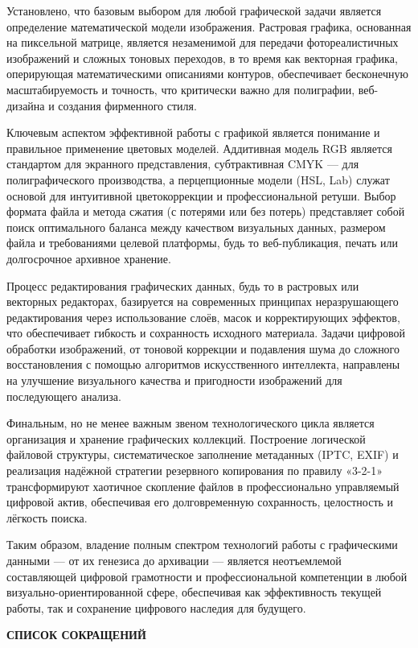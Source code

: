\documentclass{SibFU-docs}
\begin{document}
Установлено, что базовым выбором для любой графической задачи является определение математической модели изображения. Растровая графика, основанная на пиксельной матрице, является незаменимой для передачи фотореалистичных изображений и сложных тоновых переходов, в то время как векторная графика, оперирующая математическими описаниями контуров, обеспечивает бесконечную масштабируемость и точность, что критически важно для полиграфии, веб-дизайна и создания фирменного стиля.

Ключевым аспектом эффективной работы с графикой является понимание и правильное применение цветовых моделей. Аддитивная модель RGB является стандартом для экранного представления, субтрактивная CMYK — для полиграфического производства, а перцепционные модели (HSL, Lab) служат основой для интуитивной цветокоррекции и профессиональной ретуши. Выбор формата файла и метода сжатия (с потерями или без потерь) представляет собой поиск оптимального баланса между качеством визуальных данных, размером файла и требованиями целевой платформы, будь то веб-публикация, печать или долгосрочное архивное хранение.

Процесс редактирования графических данных, будь то в растровых или векторных редакторах, базируется на современных принципах неразрушающего редактирования через использование слоёв, масок и корректирующих эффектов, что обеспечивает гибкость и сохранность исходного материала. Задачи цифровой обработки изображений, от тоновой коррекции и подавления шума до сложного восстановления с помощью алгоритмов искусственного интеллекта, направлены на улучшение визуального качества и пригодности изображений для последующего анализа.

Финальным, но не менее важным звеном технологического цикла является организация и хранение графических коллекций. Построение логической файловой структуры, систематическое заполнение метаданных (IPTC, EXIF) и реализация надёжной стратегии резервного копирования по правилу «3-2-1» трансформируют хаотичное скопление файлов в профессионально управляемый цифровой актив, обеспечивая его долговременную сохранность, целостность и лёгкость поиска.

Таким образом, владение полным спектром технологий работы с графическими данными — от их генезиса до архивации — является неотъемлемой составляющей цифровой грамотности и профессиональной компетенции в любой визуально-ориентированной сфере, обеспечивая как эффективность текущей работы, так и сохранение цифрового наследия для будущего.

\newpage
\begin{center}\textbf{СПИСОК СОКРАЩЕНИЙ}\end{center}
{}
\end{document}
